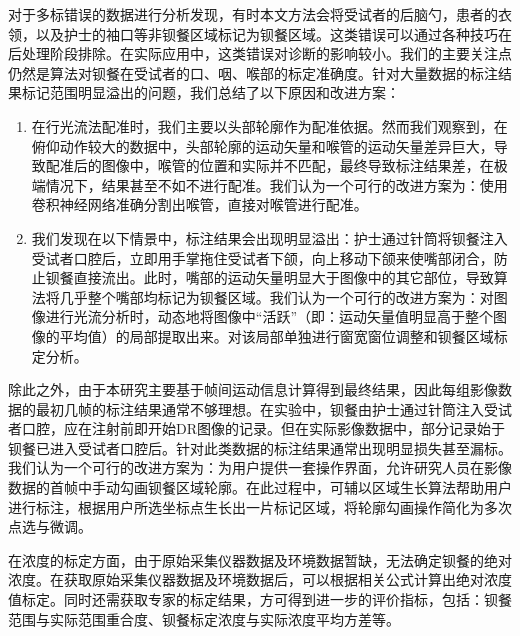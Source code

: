 对于多标错误的数据进行分析发现，有时本文方法会将受试者的后脑勺，患者的衣领，以及护士的袖口等非钡餐区域标记为钡餐区域。这类错误可以通过各种技巧在后处理阶段排除。在实际应用中，这类错误对诊断的影响较小。我们的主要关注点仍然是算法对钡餐在受试者的口、咽、喉部的标定准确度。针对大量数据的标注结果标记范围明显溢出的问题，我们总结了以下原因和改进方案：
\begin{enumerate}
    \item 在行光流法配准时，我们主要以头部轮廓作为配准依据。然而我们观察到，在俯仰动作较大的数据中，头部轮廓的运动矢量和喉管的运动矢量差异巨大，导致配准后的图像中，喉管的位置和实际并不匹配，最终导致标注结果差，在极端情况下，结果甚至不如不进行配准。我们认为一个可行的改进方案为：使用卷积神经网络准确分割出喉管，直接对喉管进行配准。
    \item 我们发现在以下情景中，标注结果会出现明显溢出：护士通过针筒将钡餐注入受试者口腔后，立即用手掌拖住受试者下颌，向上移动下颌来使嘴部闭合，防止钡餐直接流出。此时，嘴部的运动矢量明显大于图像中的其它部位，导致算法将几乎整个嘴部均标记为钡餐区域。我们认为一个可行的改进方案为：对图像进行光流分析时，动态地将图像中“活跃”（即：运动矢量值明显高于整个图像的平均值）的局部提取出来。对该局部单独进行窗宽窗位调整和钡餐区域标定分析。
\end{enumerate}

除此之外，由于本研究主要基于帧间运动信息计算得到最终结果，因此每组影像数据的最初几帧的标注结果通常不够理想。在实验中，钡餐由护士通过针筒注入受试者口腔，应在注射前即开始DR图像的记录。但在实际影像数据中，部分记录始于钡餐已进入受试者口腔后。针对此类数据的标注结果通常出现明显损失甚至漏标。我们认为一个可行的改进方案为：为用户提供一套操作界面，允许研究人员在影像数据的首帧中手动勾画钡餐区域轮廓。在此过程中，可辅以区域生长算法\cite{REVOLMULLER2002137}帮助用户进行标注，根据用户所选坐标点生长出一片标记区域，将轮廓勾画操作简化为多次点选与微调。    

在浓度的标定方面，由于原始采集仪器数据及环境数据暂缺，无法确定钡餐的绝对浓度。在获取原始采集仪器数据及环境数据后，可以根据相关公式计算出绝对浓度值标定。同时还需获取专家的标定结果，方可得到进一步的评价指标，包括：钡餐范围与实际范围重合度、钡餐标定浓度与实际浓度平均方差等。
